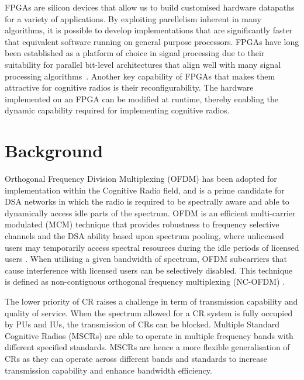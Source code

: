 FPGAs are silicon devices that allow us to build customised hardware datapaths for a variety of applications.
By exploiting parellelism inherent in many algorithms, it is possible to develop implementations that are significantly faster that equivalent software running on general purpose processors.
FPGAs have long been established as a platform of choice in signal processing due to their suitability for parallel bit-level architectures that align well with many signal processing algorithms~\cite{cummings1999}.
Another key capability of FPGAs that makes them attractive for cognitive radios is their reconfigurability.
The hardware implemented on an FPGA can be modified at runtime, thereby enabling the dynamic capability required for implementing cognitive radios.

\section{Background}



Orthogonal Frequency Division Multiplexing (OFDM) has been adopted for implementation within the Cognitive Radio field, and is a prime candidate for DSA networks in which the radio is required to be spectrally aware and able to dynamically access idle parts of the spectrum.
OFDM is an efficient multi-carrier modulated (MCM) technique that provides robustness to frequency selective channels and the DSA ability based upon spectrum pooling, where unlicensed users may temporarily access spectral resources during the idle periods of licensed users \cite{JondralMarch2004}.
When utilising a given bandwidth of spectrum, OFDM subcarriers that cause interference with licensed users can be selectively disabled.
This technique is defined as non-contiguous orthogonal frequency multiplexing (NC-OFDM) \cite{MindenJune2006}.

The lower priority of CR raises a challenge in term of transmission capability and quality of service. When the spectrum allowed for a CR system is fully occupied by PUs and IUs, the transmission of CRs can be blocked.
Multiple Standard Cognitive Radios (MSCRs) are able to operate in multiple frequency bands with different specified standards.
MSCRs are hence a more flexible generalisation of CRs as they can operate across different bands and standards to increase transmission capability and enhance bandwidth efficiency.

